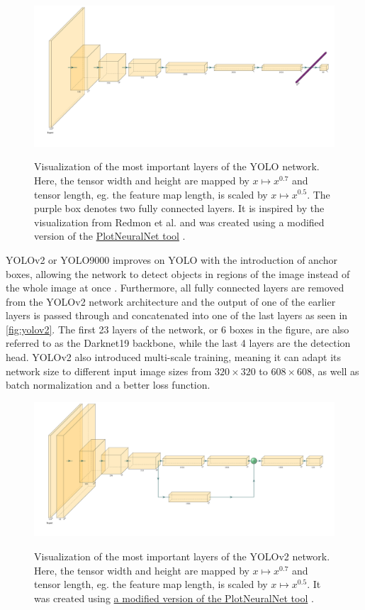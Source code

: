 \documentclass[10pt]{book}
\newcommand{\figureref}[1]{\autoref{#1}}
\begin{document}
\begin{figure}
  \caption{Visualization of the most important layers of the \ac{YOLO} network. Here, the tensor width and height are mapped by $x \mapsto x^{0.7}$ and tensor length, eg. the feature map length, is scaled by $x \mapsto x^{0.5}$. The purple box denotes two fully connected layers. It is inspired by the visualization from Redmon et al. \cite{redmon2016you} and was created using a modified version of the \href{https://github.com/jnccd/PlotNeuralNet}{PlotNeuralNet tool} \cite{haris_iqbal_2018_2526396}.}
  \includegraphics[width=\textwidth]{image/yolo}
  \label{fig:yolo}
\end{figure}

\ac{YOLO}v2 or \ac{YOLO}9000 improves on \ac{YOLO} with the introduction of anchor boxes, allowing the network to detect objects in regions of the image instead of the whole image at once \cite{redmon2017yolo9000}. Furthermore, all fully connected layers are removed from the \ac{YOLO}v2 network architecture and the output of one of the earlier layers is passed through and concatenated into one of the last layers as seen in \figureref{fig:yolov2}. The first 23 layers of the network, or 6 boxes in the figure, are also referred to as the Darknet19 backbone, while the last 4 layers are the detection head. \ac{YOLO}v2 also introduced multi-scale training, meaning it can adapt its network size to different input image sizes from $320 \times 320$ to $608 \times 608$, as well as batch normalization and a better loss function.

\begin{figure}
  \caption{Visualization of the most important layers of the \ac{YOLO}v2 network. Here, the tensor width and height are mapped by $x \mapsto x^{0.7}$ and tensor length, eg. the feature map length, is scaled by $x \mapsto x^{0.5}$. It was created using \href{https://github.com/jnccd/PlotNeuralNet}{a modified version of the PlotNeuralNet tool} \cite{haris_iqbal_2018_2526396}.}
  \includegraphics[width=\textwidth]{image/yolov2}
  \label{fig:yolov2}
\end{figure}
\end{document}
